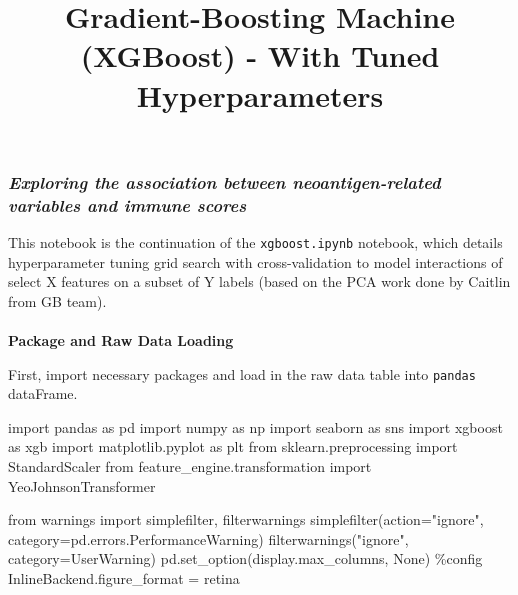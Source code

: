 \documentclass[
  letterpaper,
  DIV=11,
  numbers=noendperiod]{scrartcl}
\title{Gradient-Boosting Machine (XGBoost) - With Tuned Hyperparameters}
\author{}
\date{}
\makeatletter
\let\oldparagraph\paragraph
\renewcommand{\paragraph}{
    \@ifstar
      \xxxParagraphStar
      \xxxParagraphNoStar
  }
\newcommand{\xxxParagraphStar}[1]{\oldparagraph*{#1}\mbox{}}
\newcommand{\xxxParagraphNoStar}[1]{\oldparagraph{#1}\mbox{}}
\newenvironment{Shaded}{\begin{snugshade}}{\end{snugshade}}
\newcommand{\ImportTok}[1]{\textcolor[rgb]{0.00,0.46,0.62}{#1}}
\newcommand{\NormalTok}[1]{\textcolor[rgb]{0.00,0.23,0.31}{#1}}
\newcommand{\OperatorTok}[1]{\textcolor[rgb]{0.37,0.37,0.37}{#1}}
\newcommand{\PreprocessorTok}[1]{\textcolor[rgb]{0.68,0.00,0.00}{#1}}
\newcommand{\StringTok}[1]{\textcolor[rgb]{0.13,0.47,0.30}{#1}}
\newcommand{\VariableTok}[1]{\textcolor[rgb]{0.07,0.07,0.07}{#1}}
\makeatother
\begin{document}
\maketitle


\subsubsection{\texorpdfstring{\emph{Exploring the association between
neoantigen-related variables and immune
scores}}{Exploring the association between neoantigen-related variables and immune scores}}\label{exploring-the-association-between-neoantigen-related-variables-and-immune-scores}

This notebook is the continuation of the \texttt{xgboost.ipynb}
notebook, which details hyperparameter tuning grid search with
cross-validation to model interactions of select X features on a subset
of Y labels (based on the PCA work done by Caitlin from GB team).

\paragraph{\texorpdfstring{\textbf{Package and Raw Data
Loading}}{Package and Raw Data Loading}}\label{package-and-raw-data-loading}

First, import necessary packages and load in the raw data table into
\texttt{pandas} dataFrame.

\begin{Shaded}
\begin{Highlighting}[]
\ImportTok{import}\NormalTok{ pandas }\ImportTok{as}\NormalTok{ pd}
\ImportTok{import}\NormalTok{ numpy }\ImportTok{as}\NormalTok{ np}
\ImportTok{import}\NormalTok{ seaborn }\ImportTok{as}\NormalTok{ sns}
\ImportTok{import}\NormalTok{ xgboost }\ImportTok{as}\NormalTok{ xgb}
\ImportTok{import}\NormalTok{ matplotlib.pyplot }\ImportTok{as}\NormalTok{ plt}
\ImportTok{from}\NormalTok{ sklearn.preprocessing }\ImportTok{import}\NormalTok{ StandardScaler}
\ImportTok{from}\NormalTok{ feature\_engine.transformation }\ImportTok{import}\NormalTok{ YeoJohnsonTransformer}

\ImportTok{from}\NormalTok{ warnings }\ImportTok{import}\NormalTok{ simplefilter, filterwarnings}
\NormalTok{simplefilter(action}\OperatorTok{=}\StringTok{"ignore"}\NormalTok{, category}\OperatorTok{=}\NormalTok{pd.errors.PerformanceWarning)}
\NormalTok{filterwarnings(}\StringTok{"ignore"}\NormalTok{, category}\OperatorTok{=}\PreprocessorTok{UserWarning}\NormalTok{)}
\NormalTok{pd.set\_option(}\StringTok{\textquotesingle{}display.max\_columns\textquotesingle{}}\NormalTok{, }\VariableTok{None}\NormalTok{)}
\OperatorTok{\%}\NormalTok{config InlineBackend.figure\_format }\OperatorTok{=} \StringTok{\textquotesingle{}retina\textquotesingle{}}
\end{Highlighting}
\end{Shaded}
\end{document}
